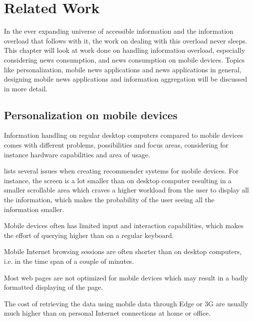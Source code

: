\chapter{Related Work}
In the ever expanding universe of accessible information and the information overload that follows with it, the work on dealing with this overload never sleeps. This chapter will look at work done on handling information overload, especially considering news consumption, and news consumption on mobile devices. Topics like personalization, mobile news applications and news applications in general, designing mobile news applications and information aggregation will be discussed in more detail.

\section{Personalization on mobile devices}

Information handling on regular desktop computers compared to mobile devices comes with different problems, possibilities and focus areas, considering for instance hardware capabilities and area of usage. 


\cite{ricci2010mobile} lists several issues when creating recommender systems for mobile devices. For instance, the screen is a lot smaller than on desktop computer resulting in a smaller scrollable area which craves a higher workload from the user to display all the information, which makes the probability of the user seeing all the information smaller.

Mobile devices often has limited input and interaction capabilities, which makes the effort of querying higher than on a regular keyboard.

Mobile Internet browsing sessions are often shorter than on desktop computers, i.e. in the time span of a couple of minutes.

Most web pages are not optimized for mobile devices which may result in a badly formatted displaying of the page.

The cost of retrieving the data using mobile data through Edge or 3G are usually much higher than on personal Internet connections at home or office.

